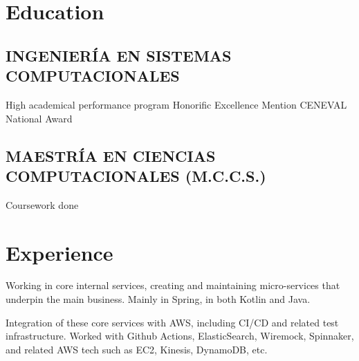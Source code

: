 \documentclass[]{plushcv}
\begin{document}
%
%


% 
%
%

\begin{minipage}[t]{0.70\textwidth}

    \section{Education}

    \subsection{INGENIERÍA EN SISTEMAS COMPUTACIONALES}
     
    High academical performance program \textbullet{} Honorific Excellence Mention \textbullet{} CENEVAL National Award
    \sectionsep

    \subsection{MAESTRÍA EN CIENCIAS COMPUTACIONALES (M.C.C.S.)}
     
    Coursework done
    \sectionsep


    \section{Experience}

    \vspace{\topsep} %
    \begin{tightemize}
        \sectionsep
        \item Working in core internal services, creating and maintaining micro-services that underpin the main business. Mainly in Spring, in both Kotlin and Java.
        \item Integration of these core services with AWS, including CI/CD and related test infrastructure. Worked with Github Actions, ElasticSearch, Wiremock, Spinnaker, and related AWS tech such as EC2, Kinesis, DynamoDB, etc.
    \end{tightemize}
    \sectionsep


\end{minipage}
\end{document}
